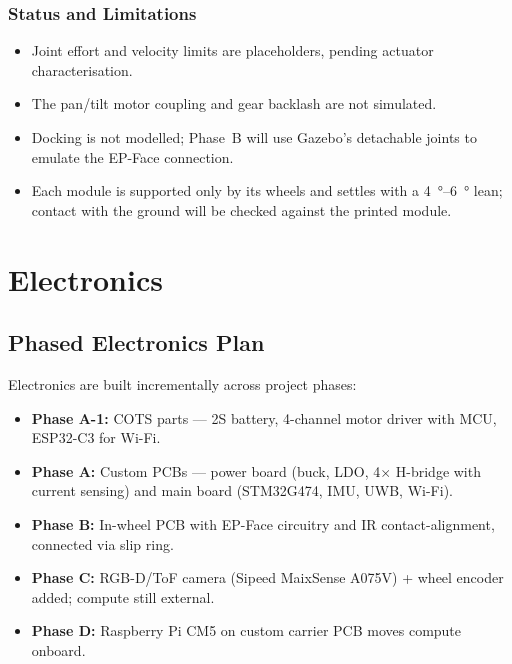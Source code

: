 \documentclass[12pt,a4paper]{article}
\begin{document}
\subsubsection{Status and Limitations}

\begin{itemize}
	\item Joint effort and velocity limits are placeholders, pending actuator characterisation.
	\item The pan/tilt motor coupling and gear backlash are not simulated.
	\item Docking is not modelled; Phase~B will use Gazebo's detachable joints to emulate the EP-Face connection.
	\item Each module is supported only by its wheels and settles with a \SIrange{4}{6}{\degree} lean; contact with the ground will be checked against the printed module.
\end{itemize}


\clearpage
\section{Electronics}
\label{sec:electronics}

\subsection{Phased Electronics Plan}

Electronics are built incrementally across project phases:

\begin{itemize}
  \item \textbf{Phase A-1:} COTS parts --- 2S battery, 4-channel motor driver with MCU, ESP32-C3 for Wi-Fi.
  \item \textbf{Phase A:} Custom PCBs --- power board (buck, LDO, 4$\times$ H-bridge with current sensing) and main board (STM32G474, IMU, UWB, Wi-Fi).
  \item \textbf{Phase B:} In-wheel PCB with EP-Face circuitry and IR contact-alignment, connected via slip ring.
  \item \textbf{Phase C:} RGB-D/ToF camera (Sipeed MaixSense A075V) + wheel encoder added; compute still external.
  \item \textbf{Phase D:} Raspberry Pi CM5 on custom carrier PCB moves compute onboard.
\end{itemize}
\end{document}

